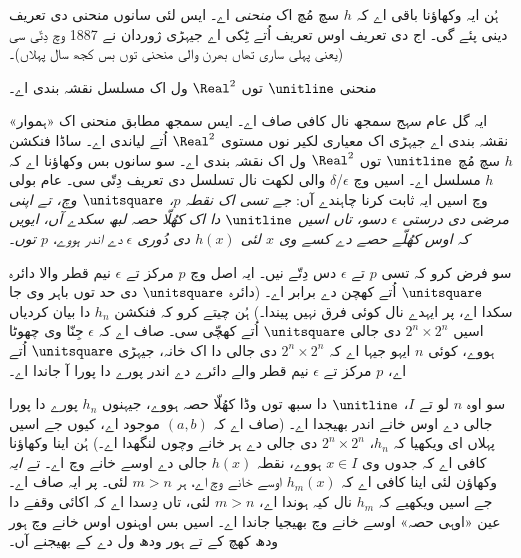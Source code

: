 \documentclass[../../../include/open-logic-section]{subfiles}
\begin{document}
ہُن ایہ وکھاؤنا باقی اے کہ $h$ سچ مُچ اک \emph{منحنی} اے۔ ایس لئی سانوں منحنی دی تعریف دینی پئے گی۔ اج دی تعریف اوس تعریف اُتے ٹِکی اے جیہڑی ژوردان نے 1887 وچ دِتّی سی (یعنی پہلی ساری تھاں بھرن والی منحنی توں بس کجھ سال پہلاں)۔

\begin{defn}
منحنی $\unitline$ توں $\Real^2$ ول اک مسلسل نقشہ بندی اے۔
\end{defn}

ایہ گل عام سہج سمجھ نال کافی صاف اے۔ ایس سمجھ مطابق منحنی اک «ہموار» نقشہ بندی اے جیہڑی اک معیاری لکیر نوں مستوی $\Real^2$ اُتے لیاندی اے۔ ساڈا فنکشن $h$ سچ مُچ $\unitline$ توں $\Real^2$ ول اک نقشہ بندی اے۔ سو سانوں بس وکھاؤنا اے کہ $h$ مسلسل اے۔ اسیں  وچ $\epsilon$/$\delta$ والی لکھت نال تسلسل دی تعریف دِتّی سی۔ عام بولی وچ اسیں ایہ ثابت کرنا چاہندے آں: \emph{جے تسی اک نقطہ $p$، $\unitsquare$ وچ، تے اپنی مرضی دی درستی $\epsilon$ دسو، تاں اسیں $\unitline$ دا اک کھُلّا حصہ لبھ سکدے آں، ایویں کہ اوس کھُلّے حصے دے کسے وی $x$ لئی $h(x)$ دی دُوری $\epsilon$ دے اندر ہووے، $p$ توں۔}

سو فرض کرو کہ تسی $p$ تے $\epsilon$ دس دِتّے نیں۔ ایہ اصل وچ $p$ مرکز تے $\epsilon$ نیم قطر والا دائرہ $\unitsquare$ اُتے کھچن دے برابر اے۔ (دائرہ $\unitsquare$ دی حد توں باہر وی جا سکدا اے، پر ایہدے نال کوئی فرق نہیں پیندا۔) ہُن چیتے کرو کہ فنکشن $h_n$ دا بیان کردیاں اسیں $2^n \times 2^n$ دی جالی $\unitsquare$ اُتے کھچّی سی۔ صاف اے کہ $\epsilon$ جِنّا وی چھوٹا ہووے، کوئی $n$ ایہو جیہا اے کہ $2^n \times 2^n$ دی جالی دا اک خانہ، جیہڑی $\unitsquare$ اُتے اے، $p$ مرکز تے $\epsilon$ نیم قطر والے دائرے دے اندر پورے دا پورا آ جاندا اے۔

سو اوہ $n$ لو تے $I$، $\unitline$ دا سبھ توں وڈا کھُلّا حصہ ہووے، جیہنوں $h_n$ پورے دا پورا جالی دے اوس خانے اندر بھیجدا اے۔ (صاف اے کہ $(a,b)$ موجود اے، کیوں جے اسیں پہلاں ای ویکھیا کہ $h_n$، $2^n\times 2^n$ دی جالی دے ہر خانے وچوں لنگھدا اے۔) ہُن اینا وکھاؤنا کافی اے کہ جدوں وی $x \in I$ ہووے، نقطہ $h(x)$ جالی دے اوسے خانے وچ اے۔ تے \emph{ایہ} وکھاؤن لئی اینا کافی اے کہ $h_m(x)$ اوسے خانے وچ اے، ہر $m > n$ لئی۔ پر ایہ صاف اے۔ جے اسیں ویکھیے کہ $h_m$ نال کیہ ہوندا اے، $m > n$ لئی، تاں دِسدا اے کہ اکائی وقفے دا عین «اوہی حصہ» اوسے خانے وچ بھیجیا جاندا اے۔ اسیں بس اوہنوں اوس خانے وچ ہور ودھ کھچ کے تے ہور ودھ ول دے کے بھیجنے آں۔
\end{document}
